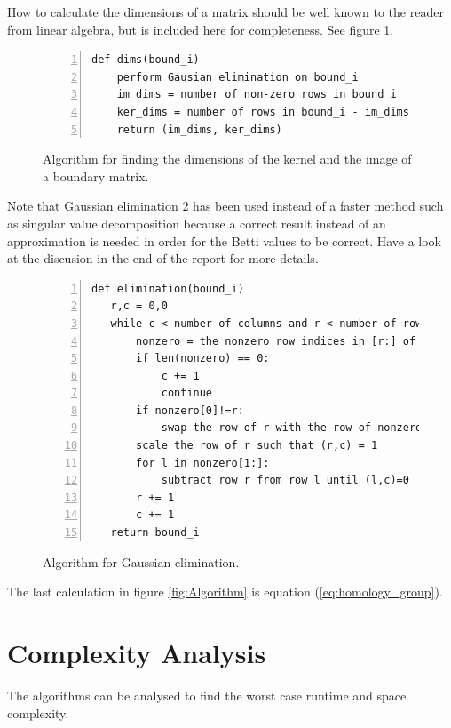 \documentclass[11pt,a4paper,twoside, openright]{report}
\begin{document}
How to calculate the dimensions of a matrix should be well known to the reader from linear algebra, but is included here for completeness. See figure \ref{fig:Algorithm_dims}.
\begin{figure}[H]
\begin{lstlisting}[numbers=left]
def dims(bound_i)
    perform Gausian elimination on bound_i
    im_dims = number of non-zero rows in bound_i
    ker_dims = number of rows in bound_i - im_dims
    return (im_dims, ker_dims)
\end{lstlisting}
\caption{Algorithm for finding the dimensions of the kernel and the image of a boundary matrix.}
\label{fig:Algorithm_dims}
\end{figure}
Note that Gaussian elimination \ref{fig:Algorithm_gauss} has been used instead of a faster method such as singular value decomposition because a correct result instead of an approximation is needed in order for the Betti values to be correct. Have a look at the discusion in the end of the report for more details.
\begin{figure}[H]
\begin{lstlisting}[numbers=left]
def elimination(bound_i)
   r,c = 0,0
   while c < number of columns and r < number of rows:
       nonzero = the nonzero row indices in [r:] of column c
       if len(nonzero) == 0:
           c += 1
           continue
       if nonzero[0]!=r:
           swap the row of r with the row of nonzero
       scale the row of r such that (r,c) = 1
       for l in nonzero[1:]:
           subtract row r from row l until (l,c)=0
       r += 1
       c += 1
   return bound_i
\end{lstlisting}
\caption{Algorithm for Gaussian elimination.}
\label{fig:Algorithm_gauss}
\end{figure}
The last calculation in figure \ref{fig:Algorithm} is equation (\ref{eq:homology_group}).
\section{Complexity Analysis}
The algorithms can be analysed to find the worst case runtime and space complexity. 
\end{document}
